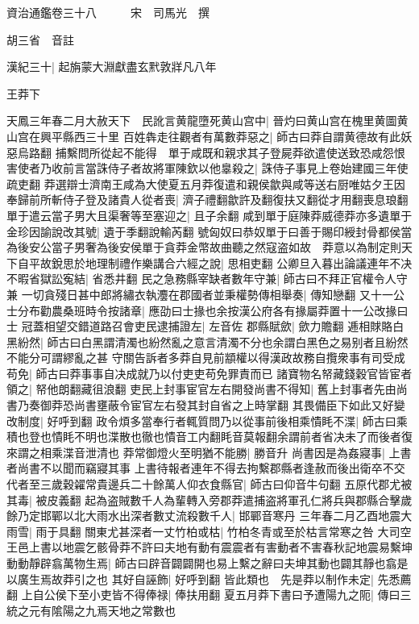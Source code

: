 資治通鑑卷三十八　　　宋　司馬光　撰

胡三省　音註

漢紀三十|{
	起旃蒙大淵獻盡玄黓敦牂凡八年}


王莽下

天鳳三年春二月大赦天下　民訛言黄龍墮死黄山宫中|{
	晉灼曰黄山宫在槐里黄圖黄山宫在興平縣西三十里}
百姓犇走往觀者有萬數莽惡之|{
	師古曰莽自謂黄德故有此妖惡烏路翻}
捕繫問所從起不能得　單于咸既和親求其子登屍莽欲遣使送致恐咸怨恨害使者乃收前言當誅侍子者故將軍陳欽以他辠殺之|{
	誅侍子事見上卷始建國三年使疏吏翻}
莽選辯士濟南王咸為大使夏五月莽復遣和親侯歙與咸等送右厨唯姑夕王因奉歸前所斬侍子登及諸貴人從者喪|{
	濟子禮翻歙許及翻復扶又翻從才用翻喪息琅翻}
單于遣云當子男大且渠奢等至塞迎之|{
	且子余翻}
咸到單于庭陳莽威德莽亦多遺單于金珍因諭說改其號|{
	遺于季翻說輸芮翻}
號匈奴曰恭奴單于曰善于賜印綬封骨都侯當為後安公當子男奢為後安侯單于貪莽金幣故曲聽之然寇盗如故　莽意以為制定則天下自平故銳思於地理制禮作樂講合六經之說|{
	思相吏翻}
公卿旦入暮出論議連年不决不暇省獄訟寃結|{
	省悉井翻}
民之急務縣宰缺者數年守兼|{
	師古曰不拜正官權令人守兼}
一切貪殘日甚中郎將繡衣執灋在郡國者並秉權勢傳相舉奏|{
	傳知戀翻}
又十一公士分布勸農桑班時令按諸章|{
	應劭曰士掾也余按漢公府各有掾屬莽置十一公改掾曰士}
冠蓋相望交錯道路召會吏民逮捕證左|{
	左音佐}
郡縣賦歛|{
	歛力贍翻}
逓相賕賂白黑紛然|{
	師古曰白黑謂清濁也紛然亂之意言清濁不分也余謂白黑色之易别者且紛然不能分可謂繆亂之甚}
守關告訴者多莽自見前顓權以得漢政故務自攬衆事有司受成苟免|{
	師古曰莽事事自决成就乃以付吏吏苟免罪責而已}
諸寶物名帑藏錢穀官皆宦者領之|{
	帑他朗翻藏徂浪翻}
吏民上封事宦官左右開發尚書不得知|{
	舊上封事者先由尚書乃奏御莽恐尚書壅蔽令宦官左右發其封自省之上時掌翻}
其畏備臣下如此又好變改制度|{
	好呼到翻}
政令煩多當奉行者輒質問乃以從事前後相乘憒眊不渫|{
	師古曰乘積也登也憒眊不明也渫散也徹也憒音工内翻眊音莫報翻余謂前者省决未了而後者復來謂之相乘渫音泄清也}
莽常御燈火至明猶不能勝|{
	勝音升}
尚書因是為姦寢事|{
	上書者尚書不以聞而竊寢其事}
上書待報者連年不得去拘繫郡縣者逢赦而後出衛卒不交代者至三歲穀糴常貴邊兵二十餘萬人仰衣食縣官|{
	師古曰仰音牛句翻}
五原代郡尤被其毒|{
	被皮義翻}
起為盗賊數千人為輩轉入旁郡莽遣捕盗將軍孔仁將兵與郡縣合擊歲餘乃定邯鄲以北大雨水出深者數丈流殺數千人|{
	邯鄲音寒丹}
三年春二月乙酉地震大雨雪|{
	雨于具翻}
關東尤甚深者一丈竹柏或枯|{
	竹柏冬青或至於枯言常寒之咎}
大司空王邑上書以地震乞骸骨莽不許曰夫地有動有震震者有害動者不害春秋記地震易繫坤動動靜辟翕萬物生焉|{
	師古曰辟音闢闢開也易上繫之辭曰夫坤其動也闢其靜也翕是以廣生焉故莽引之也}
其好自誣飾|{
	好呼到翻}
皆此類也　先是莽以制作未定|{
	先悉薦翻}
上自公侯下至小吏皆不得俸禄|{
	俸扶用翻}
夏五月莽下書曰予遭陽九之阨|{
	傳曰三統之元有隂陽之九焉天地之常數也}
